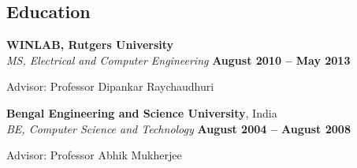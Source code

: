 \documentclass[margin,line]{resume}
\begin{document}
\begin{resume}


    \section{\mysidestyle Education}

    \textbf{WINLAB, Rutgers University}\\ %
    \textsl{MS, Electrical and Computer Engineering} \hfill \textbf{ August 2010 -- May 2013}\vspace{-3mm}\\\vspace{-1mm}%
    \begin{list2}
        \item Advisor:  Professor Dipankar Raychaudhuri
    \end{list2}\vspace{-1.5mm}

    \textbf{Bengal Engineering and Science University}, India \\%
    \textsl{BE, Computer Science and Technology} \hfill \textbf{ August 2004 -- August 2008}\vspace{-3mm}\\\vspace{-1mm}%
    \begin{list2}
        \item Advisor:  Professor Abhik Mukherjee
    \end{list2}\vspace{-1.5mm}


\end{resume}
\end{document}
